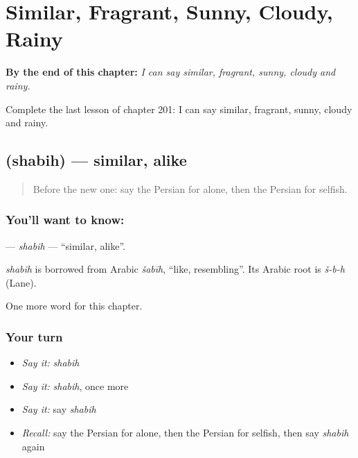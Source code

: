
\chapter{Similar, Fragrant, Sunny, Cloudy, Rainy}
\label{ch:fa-similar-fragrant-sunny-cloudy-rainy}

\begin{chapteropening}
\textbf{By the end of this chapter:} \emph{I can say similar, fragrant, sunny, cloudy and rainy.}

Complete the last lesson of chapter 201: I can say similar, fragrant, sunny, cloudy and rainy.
\end{chapteropening}

\section[\texorpdfstring{\fa{شبیه} (shabih)}{شبیه (shabih)}]{ (shabih) — similar, alike}

\label{lesson:FA-C201-shabih}



\begin{quote}
Before the new one: say the Persian for alone, then the Persian for selfish.
\end{quote}

\subsection*{You'll want to know: }
\textbf{} — \emph{shabih} — \textquotedblleft{}similar, alike\textquotedblright{}.

\begin{cousinweb}
\emph{shabih} is borrowed from Arabic \emph{šabīh}, \textquotedblleft{}like, resembling\textquotedblright{}. Its Arabic root is \emph{š-b-h} (Lane).
\end{cousinweb}

\begin{grammarlens}[title={What you've built}]
One more word for this chapter.
\end{grammarlens}

\subsection*{Your turn}
\begin{itemize}
\raggedright
  \item \emph{Say it:} \emph{shabih}
  \item \emph{Say it:} \emph{shabih}, once more
  \item \emph{Say it:} say \emph{shabih}
  \item \emph{Recall:} say the Persian for alone, then the Persian for selfish, then say \emph{shabih} again
\end{itemize}

